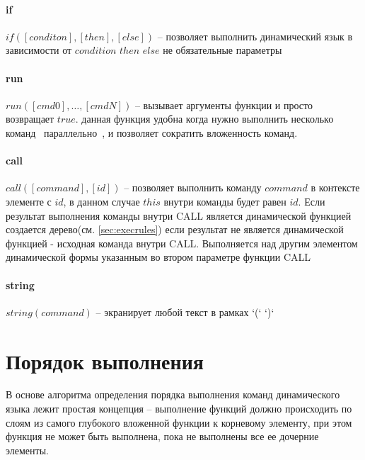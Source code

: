 \documentclass[../index.tex]{subfiles}
\begin{document}
\paragraph{if}
$if([conditon], [then], [else])$ -- позволяет выполнить динамический язык в зависимости от $condition$
$then$ $else$ не обязательные параметры

\label{p:run}
\paragraph{run}
$run([cmd0], \dotsc, [cmdN])$ -- вызывает аргументы функции и просто возвращает $true$. данная функция 
удобна когда нужно выполнить несколько команд ~параллельно~, и позволяет сократить вложенность команд.

\label{p:call}
\paragraph{call}
$call([command], [id])$ -- позволяет выполнить команду $command$ в контексте элементе с $id$, 
в данном случае $this$ внутри команды будет равен $id$. Если результат выполнения команды внутри CALL 
является динамической функцией создается дерево(см. \autoref{sec:execrules}) 
если результат не является динамической функцией - исходная команда внутри CALL. 
Выполняется над другим элементом динамической формы указанным во втором параметре функции CALL 

\label{p:string}
\paragraph{string}
$string(command)$ -- экранирует любой текст в рамках `(` `)`

\section{Порядок выполнения}\label{sec:execrules} 

В основе алгоритма определения порядка выполнения команд динамического языка лежит простая концепция -- выполнение функций должно происходить по слоям из самого глубокого вложенной функции к корневому элементу, при этом функция не может быть выполнена, пока не выполнены все ее дочерние элементы.
\end{document}
